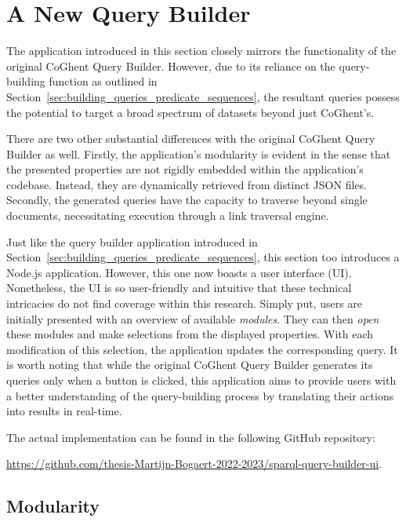 \section{A New Query Builder}
\label{sec:new_query_builder}

The application introduced in this section closely mirrors the functionality of the original CoGhent Query Builder. However, due to its reliance on the query-building function as outlined in Section~\ref{sec:building_queries_predicate_sequences}, the resultant queries possess the potential to target a broad spectrum of datasets beyond just CoGhent's.

There are two other substantial differences with the original CoGhent Query Builder as well. Firstly, the application's modularity is evident in the sense that the presented properties are not rigidly embedded within the application's codebase. Instead, they are dynamically retrieved from distinct JSON files. Secondly, the generated queries have the capacity to traverse beyond single documents, necessitating execution through a link traversal engine.

Just like the query builder application introduced in Section~\ref{sec:building_queries_predicate_sequences}, this section too introduces a Node.js application. However, this one now boasts a user interface (UI). Nonetheless, the UI is so user-friendly and intuitive that these technical intricacies do not find coverage within this research. Simply put, users are initially presented with an overview of available \textit{modules}. They can then \textit{open} these modules and make selections from the displayed properties. With each modification of this selection, the application updates the corresponding query. It is worth noting that while the original CoGhent Query Builder generates its queries only when a button is clicked, this application aims to provide users with a better understanding of the query-building process by translating their actions into results in real-time.

The actual implementation can be found in the following GitHub repository:
\begin{center}
    \url{https://github.com/thesis-Martijn-Bogaert-2022-2023/sparql-query-builder-ui}.
\end{center}

\subsection{Modularity}


